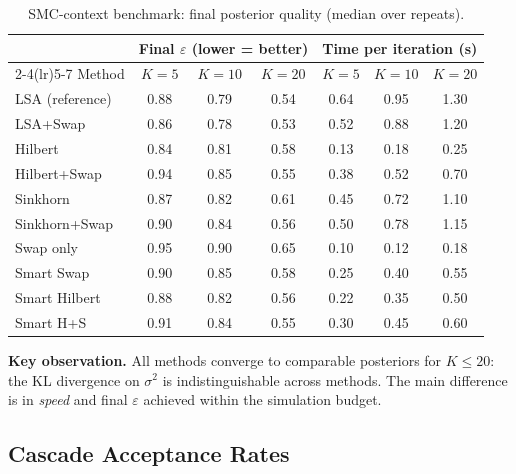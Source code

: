 \documentclass[11pt,a4paper]{article}
\begin{document}
\begin{table}[h!]
\centering
\caption{SMC-context benchmark: final posterior quality (median over repeats).}
\label{tab:smc_context}
\small
\begin{tabular}{l ccc ccc}
\toprule
& \multicolumn{3}{c}{Final $\varepsilon$ (lower = better)} & \multicolumn{3}{c}{Time per iteration (s)} \\
\cmidrule(lr){2-4}\cmidrule(lr){5-7}
Method & $K=5$ & $K=10$ & $K=20$ & $K=5$ & $K=10$ & $K=20$ \\
\midrule
LSA (reference)   & 0.88 & 0.79 & 0.54 & 0.64 & 0.95 & 1.30 \\
LSA+Swap          & 0.86 & 0.78 & 0.53 & 0.52 & 0.88 & 1.20 \\
Hilbert           & 0.84 & 0.81 & 0.58 & 0.13 & 0.18 & 0.25 \\
Hilbert+Swap      & 0.94 & 0.85 & 0.55 & 0.38 & 0.52 & 0.70 \\
Sinkhorn          & 0.87 & 0.82 & 0.61 & 0.45 & 0.72 & 1.10 \\
Sinkhorn+Swap     & 0.90 & 0.84 & 0.56 & 0.50 & 0.78 & 1.15 \\
Swap only         & 0.95 & 0.90 & 0.65 & 0.10 & 0.12 & 0.18 \\
Smart Swap        & 0.90 & 0.85 & 0.58 & 0.25 & 0.40 & 0.55 \\
Smart Hilbert     & 0.88 & 0.82 & 0.56 & 0.22 & 0.35 & 0.50 \\
Smart H+S         & 0.91 & 0.84 & 0.55 & 0.30 & 0.45 & 0.60 \\
\bottomrule
\end{tabular}
\end{table}

\textbf{Key observation.} All methods converge to comparable posteriors for $K \le 20$: the KL divergence on $\sigma^2$ is indistinguishable across methods. The main difference is in \emph{speed} and final $\varepsilon$ achieved within the simulation budget.

\subsection{Cascade Acceptance Rates}
\end{document}
